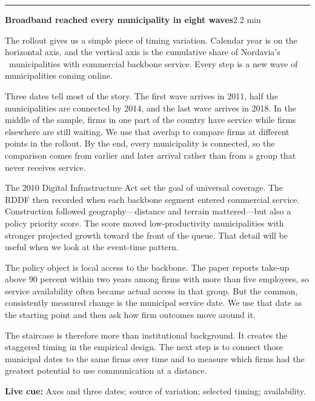\documentclass[11pt]{article}
\newcommand{\Cue}[1]{\par\nobreak\smallskip\noindent\textcolor{ScriptGray}{\footnotesize
  \textbf{Live cue:} #1}\par}
\newcommand{\scriptframe}[3]{%
  \Needspace{11\baselineskip}%
  \par\medskip\noindent\textcolor{ScriptBlue}{\rule{\linewidth}{0.55pt}}%
  \par\smallskip\noindent
  \textbf{#1}\hfill\textcolor{ScriptGray}{\small #2}\par\smallskip
  #3\par}
\begin{document}
\scriptframe{Broadband reached every municipality in eight waves}{2.2 min}{%
  The rollout gives us a simple piece of timing variation. Calendar year is on
  the horizontal axis, and the vertical axis is the cumulative share of
  Nordavia's \ResMunicipalities\ municipalities with commercial backbone
  service. Every step is a new wave of municipalities coming online.

  Three dates tell most of the story. The first wave arrives in 2011, half the
  municipalities are connected by 2014, and the last wave arrives in 2018. In
  the middle of the sample, firms in one part of the country have service while
  firms elsewhere are still waiting. We use that overlap to compare firms at
  different points in the rollout. By the end, every municipality is connected,
  so the comparison comes from earlier and later arrival rather than from a
  group that never receives service.

  The 2010 Digital Infrastructure Act set the goal of universal coverage. The
  RDDF then recorded when each backbone segment entered commercial service.
  Construction followed geography---distance and terrain mattered---but also a
  policy priority score. The score moved low-productivity municipalities with
  stronger projected growth toward the front of the queue. That detail will be
  useful when we look at the event-time pattern.

  The policy object is local access to the backbone. The paper reports take-up
  above 90 percent within two years among firms with more than five employees,
  so service availability often became actual access in that group. But the
  common, consistently measured change is the municipal service date. We use
  that date as the starting point and then ask how firm outcomes move around
  it.

  The staircase is therefore more than institutional background. It creates
  the staggered timing in the empirical design. The next step is to connect
  those municipal dates to the same firms over time and to measure which firms
  had the greatest potential to use communication at a distance.
  \Cue{Axes and three dates; source of variation; selected timing; availability.}
}
\end{document}
